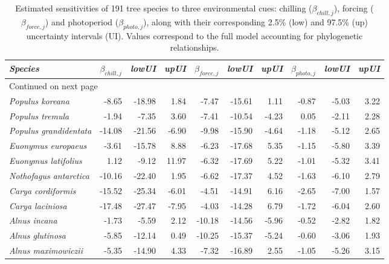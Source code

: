 \documentclass[11pt]{article}
\begin{document}
\begingroup\footnotesize
\begin{longtable}{lrrrrrrrrr}
\caption{Estimated sensitivities of 191 tree species to three environmental cues: chilling ($\beta_{chill,j}$), forcing ($\beta_{force,j}$) and photoperiod ($\beta_{photo,j}$), along with their corresponding 2.5\% (low) and 97.5\% (up) uncertainty intervals (UI). Values correspond to the full model accounting for phylogenetic relationships.} \\ 
  \hline
\emph{Species} & \emph{$\beta_{chill,j}$} & \emph{lowUI} & \emph{upUI} & \emph{$\beta_{force,j}$} & \emph{lowUI} & \emph{upUI} & \emph{$\beta_{photo,j}$} & \emph{lowUI} & \emph{upUI} \\ 
  \hline
\endhead
\hline
\multicolumn{10}{l}{\footnotesize Continued on next page}
\endfoot
\endlastfoot
 \hline
\emph{Populus deltoides} & -15.16 & -25.05 & -5.82 & -6.43 & -13.73 & 1.82 & -0.97 & -5.39 & 3.23 \\ 
  \emph{Populus koreana} & -8.65 & -18.98 & 1.84 & -7.47 & -15.61 & 1.11 & -0.87 & -5.03 & 3.22 \\ 
  \emph{Populus tremula} & -1.94 & -7.35 & 3.60 & -7.41 & -10.54 & -4.23 & 0.05 & -2.11 & 2.28 \\ 
  \emph{Populus grandidentata} & -14.08 & -21.56 & -6.90 & -9.98 & -15.90 & -4.64 & -1.18 & -5.12 & 2.65 \\ 
  \emph{Euonymus europaeus} & -3.61 & -15.78 & 8.88 & -6.23 & -17.68 & 5.35 & -1.15 & -5.80 & 3.39 \\ 
  \emph{Euonymus latifolius} & 1.12 & -9.12 & 11.97 & -6.32 & -17.69 & 5.22 & -1.01 & -5.32 & 3.41 \\ 
  \emph{Nothofagus antarctica} & -10.16 & -22.40 & 1.95 & -6.62 & -17.37 & 4.52 & -1.63 & -6.10 & 2.79 \\ 
  \emph{Carya cordiformis} & -15.52 & -25.34 & -6.01 & -4.51 & -14.91 & 6.16 & -2.65 & -7.00 & 1.57 \\ 
  \emph{Carya laciniosa} & -17.48 & -27.47 & -7.95 & -4.03 & -14.28 & 6.79 & -1.72 & -6.04 & 2.60 \\ 
  \emph{Alnus incana} & -1.73 & -5.59 & 2.12 & -10.18 & -14.56 & -5.96 & -0.52 & -2.82 & 1.82 \\ 
  \emph{Alnus glutinosa} & -5.85 & -12.14 & 0.49 & -10.25 & -15.37 & -5.24 & -0.60 & -3.06 & 1.93 \\ 
  \emph{Alnus maximowiczii} & -5.35 & -14.90 & 4.33 & -7.32 & -16.89 & 2.55 & -1.05 & -5.26 & 3.15 \\ 

\end{longtable}
\end{document}
